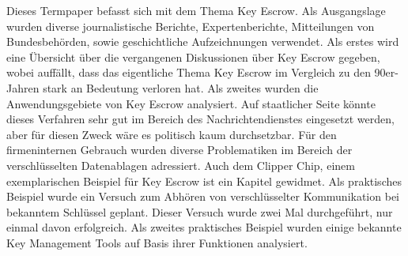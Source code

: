 Dieses Termpaper befasst sich mit dem Thema Key Escrow. Als Ausgangslage wurden diverse journalistische Berichte, Expertenberichte, Mitteilungen von Bundesbehörden, sowie geschichtliche Aufzeichnungen verwendet. Als erstes wird eine Übersicht über die vergangenen Diskussionen über Key Escrow gegeben, wobei auffällt, dass das eigentliche Thema Key Escrow im Vergleich zu den 90er-Jahren stark an Bedeutung verloren hat. Als zweites wurden die Anwendungsgebiete von Key Escrow analysiert. Auf staatlicher Seite könnte dieses Verfahren sehr gut im Bereich des Nachrichtendienstes eingesetzt werden, aber für diesen Zweck wäre es politisch kaum durchsetzbar. Für den firmeninternen Gebrauch wurden diverse Problematiken im Bereich der verschlüsselten Datenablagen adressiert. Auch dem Clipper Chip, einem exemplarischen Beispiel für Key Escrow ist ein Kapitel gewidmet. Als praktisches Beispiel wurde ein Versuch zum Abhören von verschlüsselter Kommunikation bei bekanntem Schlüssel geplant. Dieser Versuch wurde zwei Mal durchgeführt, nur einmal davon erfolgreich. Als zweites praktisches Beispiel wurden einige bekannte Key Management Tools auf Basis ihrer Funktionen analysiert.